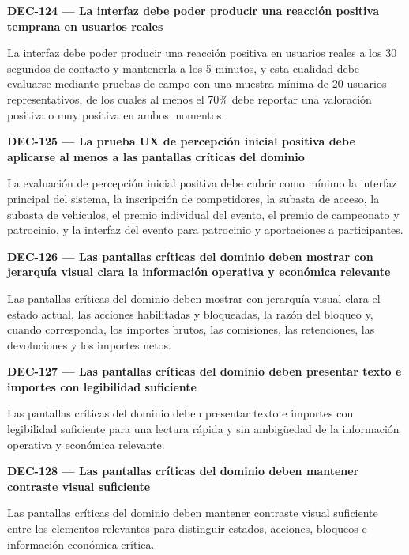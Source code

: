 \documentclass[10pt,letterpaper]{article}
\begin{document}
\noindent\textbf{DEC-124 --- La interfaz debe poder producir una reacción positiva temprana en usuarios reales}\par
La interfaz debe poder producir una reacción positiva en usuarios reales a los 30 segundos de contacto y mantenerla a los 5 minutos, y esta cualidad debe evaluarse mediante pruebas de campo con una muestra mínima de 20 usuarios representativos, de los cuales al menos el 70\% debe reportar una valoración positiva o muy positiva en ambos momentos.\par\vspace{0.45em}
\noindent\textbf{DEC-125 --- La prueba UX de percepción inicial positiva debe aplicarse al menos a las pantallas críticas del dominio}\par
La evaluación de percepción inicial positiva debe cubrir como mínimo la interfaz principal del sistema, la inscripción de competidores, la subasta de acceso, la subasta de vehículos, el premio individual del evento, el premio de campeonato y patrocinio, y la interfaz del evento para patrocinio y aportaciones a participantes.\par\vspace{0.45em}
\noindent\textbf{DEC-126 --- Las pantallas críticas del dominio deben mostrar con jerarquía visual clara la información operativa y económica relevante}\par
Las pantallas críticas del dominio deben mostrar con jerarquía visual clara el estado actual, las acciones habilitadas y bloqueadas, la razón del bloqueo y, cuando corresponda, los importes brutos, las comisiones, las retenciones, las devoluciones y los importes netos.\par\vspace{0.45em}
\noindent\textbf{DEC-127 --- Las pantallas críticas del dominio deben presentar texto e importes con legibilidad suficiente}\par
Las pantallas críticas del dominio deben presentar texto e importes con legibilidad suficiente para una lectura rápida y sin ambigüedad de la información operativa y económica relevante.\par\vspace{0.45em}
\noindent\textbf{DEC-128 --- Las pantallas críticas del dominio deben mantener contraste visual suficiente}\par
Las pantallas críticas del dominio deben mantener contraste visual suficiente entre los elementos relevantes para distinguir estados, acciones, bloqueos e información económica crítica.\par\vspace{0.45em}
\end{document}
